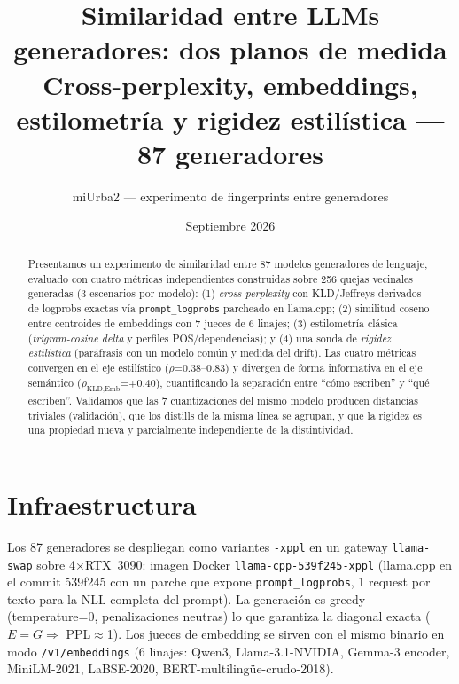 \documentclass[11pt,a4paper]{article}
\title{Similaridad entre LLMs generadores: dos planos de medida\\
\large Cross-perplexity, embeddings, estilometría y rigidez estilística --- 87 generadores}
\author{miUrba2 --- experimento de fingerprints entre generadores}
\date{Septiembre 2026}
\begin{document}
\maketitle

\begin{abstract}
Presentamos un experimento de similaridad entre 87 modelos generadores de lenguaje,
evaluado con cuatro métricas independientes construidas sobre 256 quejas vecinales
generadas (3 escenarios por modelo): (1) \emph{cross-perplexity} con KLD/Jeffreys
derivados de logprobs exactas vía \texttt{prompt\_logprobs} parcheado en llama.cpp;
(2) similitud coseno entre centroides de embeddings con 7 jueces de 6 linajes;
(3) estilometría clásica (\emph{trigram-cosine delta} y perfiles POS/dependencias);
y (4) una sonda de \emph{rigidez estilística} (paráfrasis con un modelo común y
medida del drift). Las cuatro métricas convergen en el eje estilístico
($\rho$=0.38--0.83) y divergen de forma informativa en el eje semántico
($\rho_{\text{KLD,Emb}}$=+0.40), cuantificando la separación entre ``cómo escriben''
y ``qué escriben''. Validamos que las 7 cuantizaciones del mismo modelo producen
distancias triviales (validación), que los distills de la misma línea se agrupan,
y que la rigidez es una propiedad nueva y parcialmente independiente de la
distintividad.
\end{abstract}

\section{Infraestructura}
Los 87 generadores se despliegan como variantes \texttt{-xppl} en un gateway
\texttt{llama-swap} sobre 4$\times$RTX~3090: imagen Docker \texttt{llama-cpp-539f245-xppl}
(llama.cpp en el commit 539f245 con un parche que expone \texttt{prompt\_logprobs},
1 request por texto para la NLL completa del prompt). La generación es greedy
(temperature=0, penalizaciones neutras) lo que garantiza la diagonal exacta
($E{=}G \Rightarrow$ PPL$\approx$1). Los jueces de embedding se sirven con el mismo
binario en modo \texttt{/v1/embeddings} (6 linajes: Qwen3, Llama-3.1-NVIDIA,
Gemma-3 encoder, MiniLM-2021, LaBSE-2020, BERT-multilingüe-crudo-2018).
\end{document}

